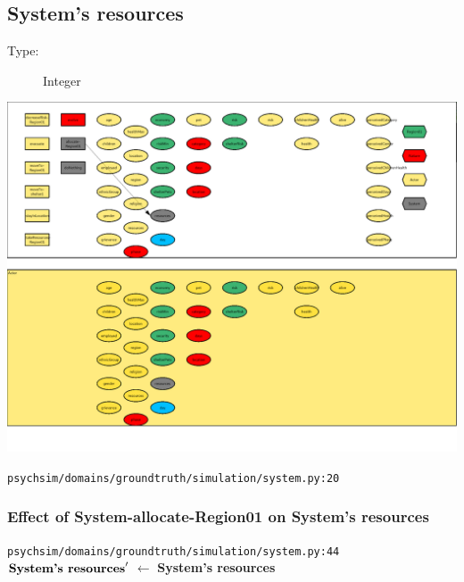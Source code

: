 \documentclass{article}%
\begin{document}
%
\subsection{System's resources}%
\label{subsec:System's resources}%
\begin{description}%
\item[Type:]%
Integer%
\end{description}%
\includegraphics[width=\textwidth]{images/resourcesOfSystem.png}%
\begin{flushleft}%
\verb|psychsim/domains/groundtruth/simulation/system.py:20|%
\end{flushleft}%
\subsubsection{Effect of System{-}allocate{-}Region01 on System's resources}%
\label{ssubsec:Effect of System{-}allocate{-}Region01 on System's resources}%
\begin{flushleft}%
\verb|psychsim/domains/groundtruth/simulation/system.py:44|%
\linebreak%
$\mbox{\textbf{System's resources}} '$%
$\leftarrow$%
\textbf{System's resources}%
\end{flushleft}

%
\end{document}
